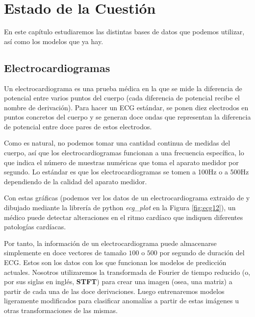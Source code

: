 \chapter{Estado de la Cuestión}
\label{cap:estadoDeLaCuestion}

\begin{resumen}
	En este capítulo estudiaremos las distintas bases de datos que podemos utilizar, así como los modelos que ya hay.
\end{resumen}

\section{Electrocardiogramas}
Un electrocardiograma es una prueba médica en la que se mide la diferencia de potencial entre varios puntos del cuerpo (cada diferencia de potencial recibe el nombre de derivación). Para hacer un ECG estándar, se ponen diez electrodos en puntos concretos del cuerpo y se generan doce ondas que representan la diferencia de potencial entre doce pares de estos electrodos.

Como es natural, no podemos tomar una cantidad continua de medidas del cuerpo, así que los electrocardiogramas funcionan a una frecuencia específica, lo que indica el número de muestras numéricas que toma el aparato medidor por segundo. Lo estándar es que los electrocardiogramas se tomen a 100Hz o a 500Hz dependiendo de la calidad del aparato medidor.

Con estas gráficas (podemos ver los datos de un electrocardiograma extraido de \cite{ptbxldb} y dibujado mediante la librería de python \emph{ecg\_plot} en la Figura \ref{fig:ecg12}), un médico puede detectar alteraciones en el ritmo cardíaco que indiquen diferentes patologías cardíacas.

Por tanto, la información de un electrocardiograma puede almacenarse simplemente en doce vectores de tamaño $100$ o $500$ por segundo de duración del ECG. Estos son los datos con los que funcionan los modelos de predicción actuales. Nosotros utilizaremos la transformada de Fourier de tiempo reducido (o, por sus siglas en inglés, \textbf{STFT}) para crear una imagen (osea, una matriz) a partir de cada una de las doce derivaciones. Luego entrenaremos modelos ligeramente modificados para clasificar anomalías a partir de estas imágenes u otras transformaciones de las mismas.

